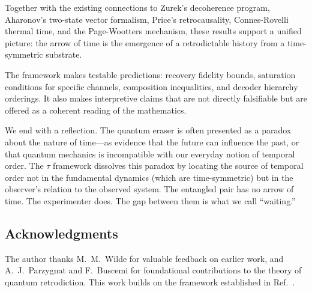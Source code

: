 \documentclass[12pt]{article}
\theoremstyle{definition}
\theoremstyle{remark}
\newcommand{\tauasym}{\tau}
\begin{document}
Together with the existing connections to Zurek's decoherence program,
Aharonov's two-state vector formalism, Price's retrocausality,
Connes-Rovelli thermal time, and the Page-Wootters mechanism, these
results support a unified picture: the arrow of time is the emergence
of a retrodictable history from a time-symmetric substrate.

The framework makes testable predictions: recovery fidelity bounds,
saturation conditions for specific channels, composition
inequalities, and decoder hierarchy orderings.  It also makes
interpretive claims that are not directly falsifiable but are
offered as a coherent reading of the mathematics.

We end with a reflection.  The quantum eraser is often presented
as a paradox about the nature of time---as evidence that the
future can influence the past, or that quantum mechanics is
incompatible with our everyday notion of temporal order.  The
$\tauasym$ framework dissolves this paradox by locating the source
of temporal order not in the fundamental dynamics (which are
time-symmetric) but in the observer's relation to the observed
system.  The entangled pair has no arrow of time.  The experimenter
does.  The gap between them is what we call ``waiting.''

\subsection*{Acknowledgments}
The author thanks M.~M.~Wilde for valuable feedback on earlier work,
and A.~J.~Parzygnat and F.~Buscemi for foundational contributions to
the theory of quantum retrodiction.  This work builds on the framework
established in Ref.~\cite{Huang2026}.

\end{document}
